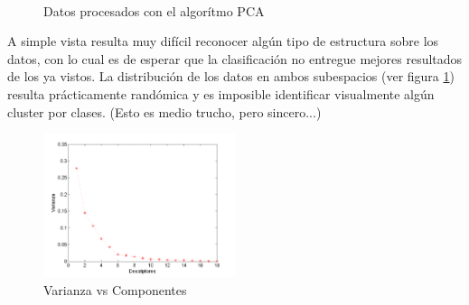 \documentclass[12pt,a4paper,titlepage]{report}
\begin{document}
\begin{figure} [H]
\centering
   \\
  \caption{Datos procesados con el algorítmo PCA} 
  \label{pcas}
\end{figure}

A simple vista resulta muy difícil reconocer algún tipo de estructura sobre los datos, con lo cual es de esperar que la clasificación no entregue mejores resultados de los ya vistos. La distribución de los datos en ambos subespacios (ver figura \ref{pcas}) resulta prácticamente randómica y es imposible identificar visualmente algún cluster por clases. (Esto es medio trucho, pero sincero...)\\

\begin{figure}
	\vspace{-20pt}
	\begin{center}
		\includegraphics[width=0.5\textwidth]{pics/varianzaPCA}
	\end{center}
	\vspace{-20pt}
	\caption{Varianza vs Componentes}
	\label{varianzaPCA}
	\vspace{-10pt}
\end{figure}
\end{document}
